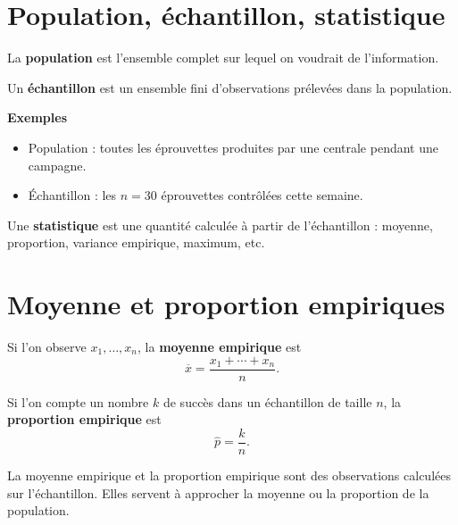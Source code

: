 
\section{Population, échantillon, statistique}

\begin{Def}
La \textbf{population} est l'ensemble complet sur lequel on voudrait de l'information.
\end{Def}

\begin{Def}
Un \textbf{échantillon} est un ensemble fini d'observations prélevées dans la population.
\end{Def}

\begin{Ex}
\textbf{Exemples}
\begin{itemize}
    \item Population : toutes les éprouvettes produites par une centrale pendant une campagne.
    \item Échantillon : les $n=30$ éprouvettes contrôlées cette semaine.
\end{itemize}
\end{Ex}

\begin{Def}
Une \textbf{statistique} est une quantité calculée à partir de l'échantillon : moyenne, proportion, variance empirique, maximum, etc.
\end{Def}

\section{Moyenne et proportion empiriques}

\begin{Def}
Si l'on observe $x_1,\dots,x_n$, la \textbf{moyenne empirique} est
$$
\overline{x}=\frac{x_1+\cdots+x_n}{n}.
$$
\end{Def}

\begin{Def}
Si l'on compte un nombre $k$ de succès dans un échantillon de taille $n$, la \textbf{proportion empirique} est
$$
\widehat{p}=\frac{k}{n}.
$$
\end{Def}

\begin{Rmq}
La moyenne empirique et la proportion empirique sont des observations calculées sur l'échantillon. Elles servent à approcher la moyenne ou la proportion de la population.
\end{Rmq}

